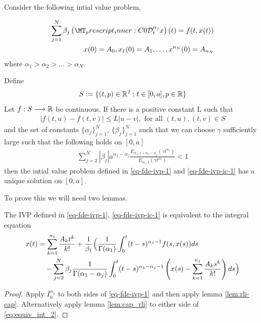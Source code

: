 \begin{mdframed}[innertopmargin=10pt]
\begin{theorem}[Uniqueness]
\label{thm-existence-uniq}
Consider the following intial value problem,

	\begin{align}
		\label{eq-fde-ivp-1}
		\sum_{j=1}^{N} \beta_j\capder{0}{t}{\alpha_j}{x}(t) = f(t,x(t)) \\
		\label{eq-fde-ivp-ic-1}
		x(0) = A_0, x_1(0) = A_1, \ldots, x^{n_N}(0) = A_{n_N}
	\end{align}
	where $ \alpha_1 > \alpha_2 > \ldots > \alpha_N $.
	
	Define
		\begin{align*}
		 S:= \{ (t,p) \in \mathbb{R}^2 : t \in [0, a], p \in \mathbb{R} \} 
		\end{align*}
	Let $ f : S \longrightarrow \mathbb{R} $ be continuous. If there is a positive constant L such that 
		\begin{align}
		\label{eq:uniq-lipshitz}
		|f(t,u) - f(t,v)| \leq L|u-v|, \text{ for all } (t,u), (t,v) \in S
		\end{align}
and the set of constants $ \{ \alpha_j \}_{j = 1}^{N} $, $ \{ \beta_j \}_{j=1}^N $
such that we can choose $ \gamma $ sufficiently large such that the following holds on $ [0, a] $
	\begin{align}
	    \label{eq:fde-uniq-cond}
\sum_{j=2}^N |\beta_j| a^{\alpha_1 - \alpha_j} \frac{E_{\alpha_1,1+\alpha_1-\alpha_j}(\gamma t^{\alpha_1})}{E_{\alpha_1,1}(\gamma t^{\alpha_1})} < 1
	\end{align}
	then the intial value problem defined in \ref{eq-fde-ivp-1} and \ref{eq-fde-ivp-ic-1} has a unique solution on $ [0, a] $.
\end{theorem}
\end{mdframed}
To prove this we will need two lemmas. 
\begin{mdframed}[innertopmargin=10pt]
\begin{lemma}
	The IVP defined in \eqref{eq-fde-ivp-1}, \eqref{eq-fde-ivp-ic-1} is equivalent to the integral equation
	\begin{align}
		\label{eq:equiv_int_2}
		x(t) &= \sum_{k=1}^{n_1}\frac{A_kt^k}{k!} + \frac{1}{\beta_1} \Bigl( \frac{1}{\Gamma(\alpha_1)}\int_{0}^{t} (t-s)^{\alpha_1 - 1}f(s,x(s))ds \\
			& \ \ \ - \sum_{j=2}^{N}\beta_j \frac{1}{\Gamma(\alpha_1 - \alpha_j)}
			\int_{0}^{t}(t-s)^{\alpha_1 - \alpha_j - 1}\left(x(s) - \sum_{k=1}^{n_j}\frac{A_ks^k}{k!} \right) ds \Bigr)
	\end{align}
\end{lemma}
\end{mdframed}
\begin{proof}
	Apply $ I_0^{\alpha_1} $ to both sides of \eqref{eq-fde-ivp-1} and then apply lemma \ref{lem:rli-cap}. Alternatively apply lemma \ref{lem:cap_rli} to either side of \eqref{eq:equiv_int_2}. 
\end{proof}

